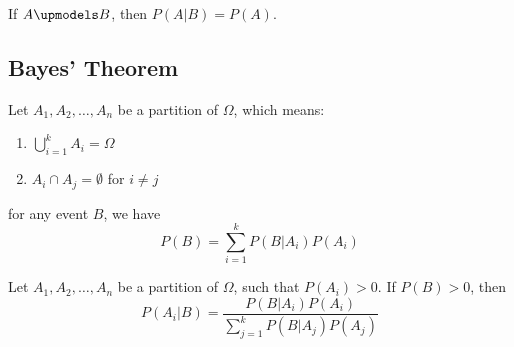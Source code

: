 \begin{lemma}
	If $A\upmodels B$, then $P(A|B)=P(A)$.
\end{lemma}

\subsection{Bayes' Theorem}

\begin{theorem}
	Let $A_1, A_2, \dots, A_n$ be a partition of $\Omega$, which means:
	\begin{enumerate}[(1)]
		\item $\mathop{\bigcup}\limits_{i=1}^{k}A_i=\Omega$
		\item $A_i\cap A_j=\emptyset$ for $i\neq j$
	\end{enumerate}
for any event $B$, we have
$$P(B) = \sum_{i=1}^{k}P(B|A_i)P(A_i)$$
\end{theorem}

\begin{theorem}
	Let $A_1, A_2, \dots, A_n$ be a partition of $\Omega$, such that $P(A_i)>0$. If $P(B)>0$, then
	$$P(A_i|B) = \frac{P(B|A_i)P(A_i)}{\sum_{j=1}^{k}P(B|A_j)P(A_j)}$$
\end{theorem}